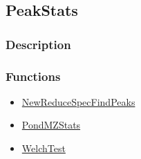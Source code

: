 \subsection{PeakStats}\label{PeakStats}
\subsubsection{Description}


\subsubsection{Functions}
\begin{itemize}
\item \hyperref[NewReduceSpecFindPeaks]{NewReduceSpecFindPeaks}
\item \hyperref[PondMZStats]{PondMZStats}
\item \hyperref[WelchTest]{WelchTest}
\end{itemize}

